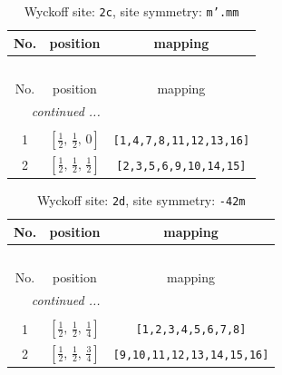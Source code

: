 \documentclass[fleqn,8pt]{jsarticle}
\begin{document}
\renewcommand{\arraystretch}{1.2}
\begin{longtable}{ccc}
\caption{Wyckoff site: {\tt 2c}, site symmetry: {\tt m'.mm}}
 \\
 \hline \hline
No. & position & mapping \\ \hline \endfirsthead

\multicolumn{2}{l}{\tablename\ \thetable{}} \\
 \hline \hline
No. & position & mapping \\ \hline \endhead

 \hline \hline
\multicolumn{2}{r}{\footnotesize\it continued ...} \\ \endfoot

 \hline \hline
\multicolumn{2}{r}{} \\ \endlastfoot

1 & $\left[ \frac{1}{2},\, \frac{1}{2},\, 0 \right]$ & {\tt [1,4,7,8,11,12,13,16]} \\ \hline
2 & $\left[ \frac{1}{2},\, \frac{1}{2},\, \frac{1}{2} \right]$ & {\tt [2,3,5,6,9,10,14,15]} \\
\end{longtable}
\renewcommand{\arraystretch}{1.2}
\begin{longtable}{ccc}
\caption{Wyckoff site: {\tt 2d}, site symmetry: {\tt -42m}}
 \\
 \hline \hline
No. & position & mapping \\ \hline \endfirsthead

\multicolumn{2}{l}{\tablename\ \thetable{}} \\
 \hline \hline
No. & position & mapping \\ \hline \endhead

 \hline \hline
\multicolumn{2}{r}{\footnotesize\it continued ...} \\ \endfoot

 \hline \hline
\multicolumn{2}{r}{} \\ \endlastfoot

1 & $\left[ \frac{1}{2},\, \frac{1}{2},\, \frac{1}{4} \right]$ & {\tt [1,2,3,4,5,6,7,8]} \\ \hline
2 & $\left[ \frac{1}{2},\, \frac{1}{2},\, \frac{3}{4} \right]$ & {\tt [9,10,11,12,13,14,15,16]} \\
\end{longtable}
\renewcommand{\arraystretch}{1.2}
\end{document}
